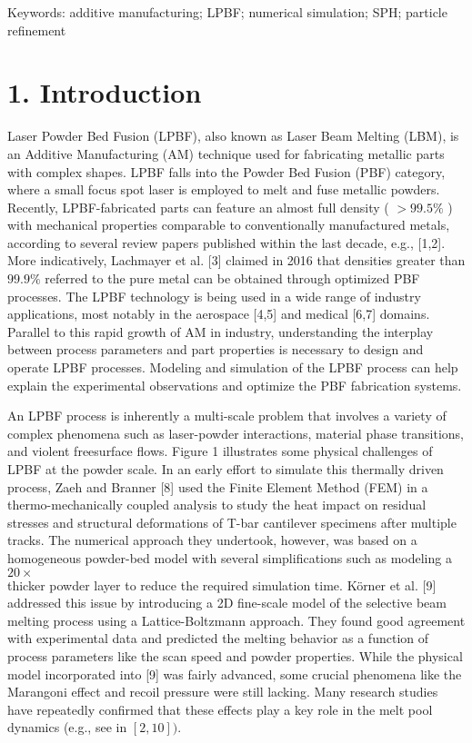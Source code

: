 \documentclass[10pt]{article}
\begin{document}
Keywords: additive manufacturing; LPBF; numerical simulation; SPH; particle refinement

\section*{1. Introduction}
Laser Powder Bed Fusion (LPBF), also known as Laser Beam Melting (LBM), is an Additive Manufacturing (AM) technique used for fabricating metallic parts with complex shapes. LPBF falls into the Powder Bed Fusion (PBF) category, where a small focus spot laser is employed to melt and fuse metallic powders. Recently, LPBF-fabricated parts can feature an almost full density ( $>99.5 \%$ ) with mechanical properties comparable to conventionally manufactured metals, according to several review papers published within the last decade, e.g., [1,2]. More indicatively, Lachmayer et al. [3] claimed in 2016 that densities greater than $99.9 \%$ referred to the pure metal can be obtained through optimized PBF processes. The LPBF technology is being used in a wide range of industry applications, most notably in the aerospace [4,5] and medical [6,7] domains. Parallel to this rapid growth of AM in industry, understanding the interplay between process parameters and part properties is necessary to design and operate LPBF processes. Modeling and simulation of the LPBF process can help explain the experimental observations and optimize the PBF fabrication systems.

An LPBF process is inherently a multi-scale problem that involves a variety of complex phenomena such as laser-powder interactions, material phase transitions, and violent freesurface flows. Figure 1 illustrates some physical challenges of LPBF at the powder scale. In an early effort to simulate this thermally driven process, Zaeh and Branner [8] used the Finite Element Method (FEM) in a thermo-mechanically coupled analysis to study the heat impact on residual stresses and structural deformations of T-bar cantilever specimens after multiple tracks. The numerical approach they undertook, however, was based on a homogeneous powder-bed model with several simplifications such as modeling a $20 \times$\\
thicker powder layer to reduce the required simulation time. Körner et al. [9] addressed this issue by introducing a 2D fine-scale model of the selective beam melting process using a Lattice-Boltzmann approach. They found good agreement with experimental data and predicted the melting behavior as a function of process parameters like the scan speed and powder properties. While the physical model incorporated into [9] was fairly advanced, some crucial phenomena like the Marangoni effect and recoil pressure were still lacking. Many research studies have repeatedly confirmed that these effects play a key role in the melt pool dynamics (e.g., see in $[2,10])$.
\end{document}
